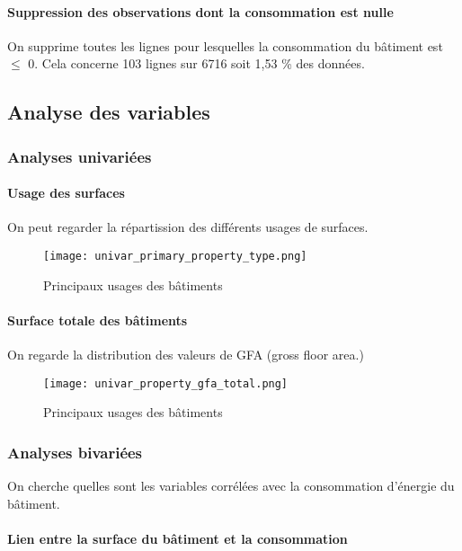 \paragraph{Suppression des observations dont la consommation est nulle}
On supprime toutes les lignes pour lesquelles la consommation du bâtiment est $\le$ 0.
Cela concerne 103 lignes sur 6716 soit 1,53 \% des données.


\subsection{Analyse des variables}

\subsubsection{Analyses univariées}

\paragraph{Usage des surfaces} On peut regarder la répartission des différents
usages de surfaces.
\begin{figure}[H]
  \texttt{[image: univar\_primary\_property\_type.png]}
  \caption{Principaux usages des bâtiments}
  \label{}
\end{figure}

\paragraph{Surface totale des bâtiments} On regarde la distribution des valeurs
de GFA (gross floor area.)
\begin{figure}[H]
  \texttt{[image: univar\_property\_gfa\_total.png]}
  \caption{Principaux usages des bâtiments}
  \label{}
\end{figure}



\subsubsection{Analyses bivariées}

On cherche quelles sont les variables corrélées avec la consommation d'énergie
du bâtiment.

\paragraph{Lien entre la surface du bâtiment et la consommation}

